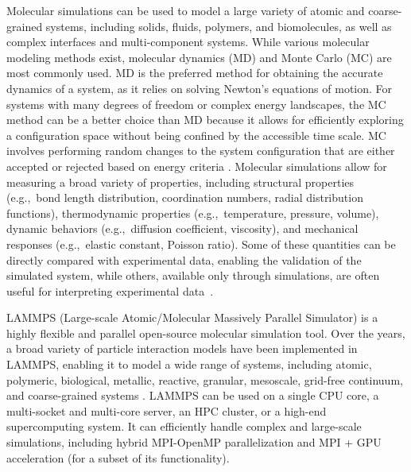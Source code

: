 \documentclass[9pt,tutorial]{livecoms}
\begin{document}
Molecular simulations can be used to model a large variety of
atomic and coarse-grained systems, including solids, fluids, polymers,
and biomolecules, as well as complex interfaces and multi-component
systems.  While various molecular modeling methods exist, molecular dynamics (MD) and
Monte Carlo (MC) are most commonly used.  MD is the preferred method for
obtaining the accurate dynamics of a system, as it relies on solving
Newton's equations of motion.  For systems with many degrees of freedom
or complex energy landscapes, the MC method can be a better choice than
MD because it allows for efficiently exploring a configuration space
without being confined by the accessible time scale.  MC involves
performing random changes to the system configuration that are either
accepted or rejected based on energy criteria
\cite{frenkel2023understanding, allen2017computer}.  Molecular simulations allow for
measuring a broad variety of properties, including structural properties
(e.g.,~bond length distribution, coordination numbers, radial
distribution functions), thermodynamic properties (e.g.,~temperature,
pressure, volume), dynamic behaviors (e.g.,~diffusion coefficient,
viscosity), and mechanical responses (e.g.,~elastic constant, Poisson
ratio).  Some of these quantities can be directly compared with
experimental data, enabling the validation of the simulated system,
while others, available only through simulations, are often useful for
interpreting experimental data~\cite{van2008molecular}.

LAMMPS (Large-scale Atomic/Molecular Massively Parallel Simulator)
\cite{lammps_home} is a highly flexible and parallel open-source molecular simulation
tool.  Over the years, a broad variety of particle interaction models
have been implemented in LAMMPS, enabling it to model a wide range of
systems, including atomic, polymeric, biological, metallic, reactive, granular,
mesoscale, grid-free continuum, and coarse-grained systems
\cite{thompson2022lammps}.  LAMMPS can be used on a single CPU core, a
multi-socket and multi-core server, an HPC cluster, or a high-end
supercomputing system.  It can efficiently handle complex and large-scale
simulations, including hybrid MPI-OpenMP parallelization
and MPI + GPU acceleration (for a subset of its functionality).
\end{document}

